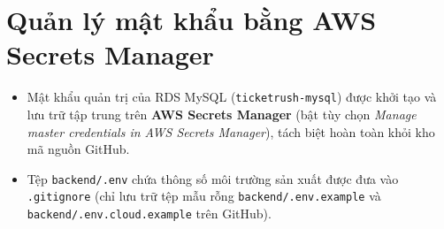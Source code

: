 \section{Quản lý mật khẩu bằng AWS Secrets Manager}
\begin{itemize}[leftmargin=1.5em]
  \item Mật khẩu quản trị của RDS MySQL (\texttt{ticketrush-mysql}) được khởi tạo và lưu trữ tập trung trên \textbf{AWS Secrets Manager} (bật tùy chọn \textit{Manage master credentials in AWS Secrets Manager}), tách biệt hoàn toàn khỏi kho mã nguồn GitHub.
  \item Tệp \texttt{backend/.env} chứa thông số môi trường sản xuất được đưa vào \texttt{.gitignore} (chỉ lưu trữ tệp mẫu rỗng \texttt{backend/.env.example} và \texttt{backend/.env.cloud.example} trên GitHub).
\end{itemize}


